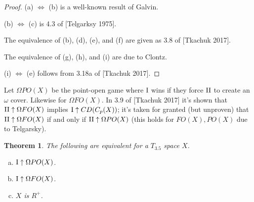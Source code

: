 \documentclass[11pt]{article}
\theoremstyle{plain}
\newtheorem{theorem}{Theorem}
\theoremstyle{definition}
\theoremstyle{remark}
\theoremstyle{plain}
\theoremstyle{definition}
\theoremstyle{remark}
\begin{document}
\begin{proof}
  (a) \(\Leftrightarrow\) (b) is a well-known result of Galvin.

  (b) \(\Leftrightarrow\) (c) is 4.3 of [Telgarksy 1975].

  The equivalence of (b), (d), (e), and (f) are given as 3.8 of [Tkachuk 2017].

  The equivalence of (g), (h), and (i) are due to Clontz.

  (i) \(\Leftrightarrow\) (e) follows from 3.18a of [Tkachuk 2017].
\end{proof}

Let \(\Omega PO(X)\) be the point-open game where \(\mathrm{I}\) wins
if they force \(\mathrm{II}\) to create an \(\omega\) cover. Likewise for
\(\Omega FO(X)\). In 3.9 of [Tkachuk 2017] it's shown that
\(\mathrm{II}\uparrow\Omega FO(X)\) implies \(\mathrm{I}\uparrow CD(C_p(X))\); it's
taken for granted (but unproven) that \(\mathrm{II}\uparrow \Omega FO(X)\) if and only if
\(\mathrm{II}\uparrow \Omega PO(X)\) 
(this holds for \(FO(X),PO(X)\) due to Telgarsky). 

\begin{theorem}
  The following are equivalent for a \(T_{3.5}\) space \(X\).
  \begin{enumerate}[a)]
  \item \(\mathrm{I}\uparrow\Omega PO(X)\).
  \item \(\mathrm{I}\uparrow\Omega FO(X)\).
  \item \(X\) is \(R^+\).
  \end{enumerate}
\end{theorem}
\end{document}
